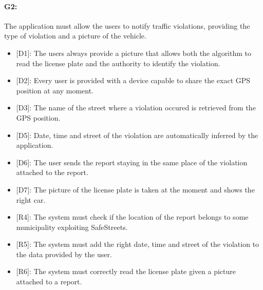 \documentclass[12pt,a4paper]{report}
\begin{document}
			\paragraph {G2:} The application must allow the users to notify traffic violations, providing the type of violation and a picture of the vehicle.
			\begin{itemize}
				\item{[D1]:} The users always provide a picture that allows both the algorithm to read the license plate and the authority to identify the violation.
				\item{[D2]:} Every user is provided with a device capable to share the exact GPS position at any moment.
				\item{[D3]:} The name of the street where a violation occured is retrieved from the GPS position.
				\item{[D5]:} Date, time and street of the violation are automatically inferred by the application.
				\item{[D6]:} The user sends the report staying in the same place of the violation attached to the report.
		 		\item{[D7]:} The picture of the license plate is taken at the moment and shows the right car.
			\end{itemize}
			\begin{itemize}
				\item{[R4]:} The system must check if the location of the report belongs to some municipality exploiting SafeStreets.
				\item{[R5]:} The system must add the right date, time and street of the violation to the data provided by the user.
				\item{[R6]:} The system must correctly read the license plate given a picture attached to a report.
			\end{itemize}
\end{document}
